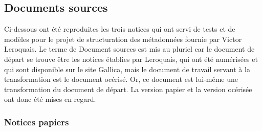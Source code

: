 \documentclass[a4paper,12pt,twoside]{book}
\begin{document}
	\subsection{\label{doc_sources}Documents sources}
	
	Ci-dessous ont été reproduites les trois notices qui ont servi de tests et de modèles pour le projet de structuration des métadonnées fournie par Victor Leroquais. Le terme de \og Document sources\fg{} est mis au pluriel car le document de départ se trouve être les notices établies par Leroquais, qui ont été numérisées et qui sont disponible sur le site Gallica, mais le document de travail servant à la transformation est le document océrisé. Or, ce document est lui-même une transformation du document de départ. La version papier et la version océrisée ont donc été mises en regard.
	
	\subsubsection{\label{notices_papiers}Notices papiers}
	
	
\end{document}
